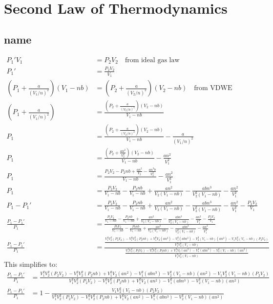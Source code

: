 \chapter{Second Law of Thermodynamics}

\section{name}

\begin{remark}
\end{remark}
\begin{align*}
    P_1'V_1 &= P_2V_2 \quad \text{from ideal gas law} \\
    P_1' &= \frac{P_2V_2}{V_1} \\
    (P_1+\frac{a}{(V_1/n)^2})(V_1-nb) &= (P_2+\frac{a}{(V_2/n)^2})(V_2-nb) \quad \text{from VDWE} \\
    (P_1+\frac{a}{(V_1/n)^2}) &= \frac{(P_2+\frac{a}{(V_2/n)^2})(V_2-nb)}{V_1-nb} \\
    P_1 &= \frac{(P_2+\frac{a}{(V_2/n)^2})(V_2-nb)}{V_1-nb} - \frac{a}{(V_1/n)^2} \\
    P_1 &= \frac{(P_2 + \frac{an^2}{V_2^2})(V_2-nb)}{V_1-nb} - \frac{an^2}{V_1^2} \\
    P_1 &= \frac{P_2V_2 - P_2nb + \frac{an^2}{V_2} - \frac{an^3b}{V_2^2}}{V_1-nb} - \frac{an^2}{V_1^2} \\
    P_1 &= \frac{P_2V_2}{V_1-nb} - \frac{P_2nb}{V_1-nb} + \frac{an^2}{V_2(V_1-nb)} - \frac{abn^3}{V_2^2(V_1-nb)} - \frac{an^2}{V_1^2} \\
    P_1 - P_1' &=  \frac{P_2V_2}{V_1-nb} - \frac{P_2nb}{V_1-nb} + \frac{an^2}{V_2(V_1-nb)} - \frac{abn^3}{V_2^2(V_1-nb)} - \frac{an^2}{V_1^2} - \frac{P_2V_2}{V_1} \\
    \frac{P_1 - P_1'}{P_1} &= \frac{\frac{P_2V_2}{V_1-nb} - \frac{P_2nb}{V_1-nb} + \frac{an^2}{V_2(V_1-nb)} - \frac{abn^3}{V_2^2(V_1-nb)} - \frac{an^2}{V_1^2} - \frac{P_2V_2}{V_1}}{\frac{P_2V_2}{V_1-nb} - \frac{P_2nb}{V_1-nb} + \frac{an^2}{V_2(V_1-nb)} - \frac{abn^3}{V_2^2(V_1-nb)} - \frac{an^2}{V_1^2}} \\
    \frac{P_1 - P_1'}{P_1} &= \frac{\frac{V_1^2V_2^2(P_2V_2) - V_1^2V_2^2(P_2nb) + V_1^2V_2(an^2)-V_1^2(abn^3)-V_2^2(V_1-nb)(an^2)-V_1V_2^2(V_1-nb)(P_2V_2)}{V_1^2V_2^2(V_1-nb)}}{\frac{V_1^2V_2^2(P_2V_2) - V_1^2V_2^2(P_2nb) + V_1^2V_2(an^2)-V_1^2(abn^3)-V_2^2(V_1-nb)(an^2)}{V_1^2V_2^2(V_1-nb)}}
\end{align*}
This simplifies to:
\begin{align*}
    \frac{P_1-P_1'}{P_1} &= \frac{V_1^2V_2^2(P_2V_2) - V_1^2V_2^2(P_2nb) + V_1^2V_2(an^2)-V_1^2(abn^3)-V_2^2(V_1-nb)(an^2)-V_1V_2^2(V_1-nb)(P_2V_2)}{V_1^2V_2^2(P_2V_2) - V_1^2V_2^2(P_2nb) + V_1^2V_2(an^2)-V_1^2(abn^3)-V_2^2(V_1-nb)(an^2)} \\
    \frac{P_1-P_1'}{P_1} &= 1 - \frac{V_1V_2^2(V_1-nb)(P_2V_2)}{V_1^2V_2^2(P_2V_2) - V_1^2V_2^2(P_2nb) + V_1^2V_2(an^2)-V_1^2(abn^3)-V_2^2(V_1-nb)(an^2)}
\end{align*}
